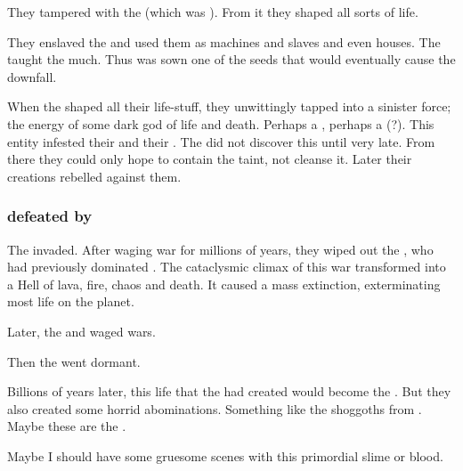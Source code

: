 They tampered with the \noggyal {} (which was ). 
From it they shaped all sorts of life. 

They enslaved the \noggyaleth and used them as machines and slaves and even houses.
The \voyagers taught the \noggyaleth much. 
Thus was sown one of the seeds that would eventually cause the \pps{\voyagers} downfall. 

When the \voyagers{} shaped all their life-stuff, they unwittingly tapped into a sinister force; the energy of some dark god of life and death. 
Perhaps a \kraken, perhaps a \xs{} (?). 
This entity infested their \dweomers{} and their . 
The \voyagers{} did not discover this until very late. 
From there they could only hope to contain the taint, not cleanse it. 
Later their creations rebelled against them. 





\subsubsection{\Voyagers defeated by \xzaishanns}
The \xss{} invaded.
After waging war for millions of years, they wiped out the \voyagers{}, who had previously dominated \Miith{}. 
The cataclysmic climax of this war transformed \Miith into a Hell of lava, fire, chaos and death. 
It caused a mass extinction, exterminating most life on the planet.


Later, the \xss{} and \krakens{} waged wars. 

Then the \xss{} went dormant. 

Billions of years later, this life that the \voyagers{} had created would become the \ophidians. 
But they also created some horrid abominations. 
Something like the shoggoths from . 
Maybe these are the . 

Maybe I should have some gruesome  scenes with this primordial slime or blood. 





